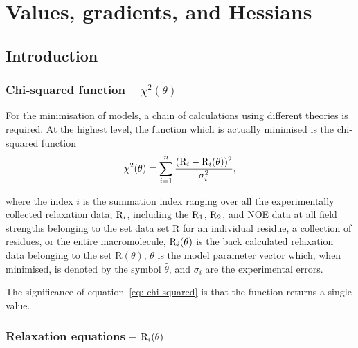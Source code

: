 
\chapter{Values, gradients, and Hessians}




\section{Introduction}


\subsection{Chi-squared function -- $\chi^2(\theta)$}

For the minimisation  of models, a chain of calculations using different theories is required.  At the highest level, the function which is actually minimised is the chi-squared function
\begin{equation} \label{eq: chi-squared}
 \chi^2(\theta) = \sum_{i=1}^n \frac{(\mathrm{R}_i - \mathrm{R}_i(\theta))^2}{\sigma_i^2},
\end{equation}

\noindent where the index $i$ is the summation index ranging over all the experimentally collected relaxation data, $\mathrm{R}_i$, including the $\mathrm{R}_1$, $\mathrm{R}_2$, and NOE data at all field strengths belonging to the set data set R for an individual residue, a collection of residues, or the entire macromolecule, $\mathrm{R}_i(\theta)$ is the back calculated relaxation data belonging to the set R$(\theta)$, $\theta$ is the model parameter vector which, when minimised, is denoted by the symbol $\hat\theta$, and $\sigma_i$ are the experimental errors.

The significance of equation~\eqref{eq: chi-squared} is that the function returns a single value.


\subsection{Relaxation equations -- $\mathrm{R}_i(\theta)$}


